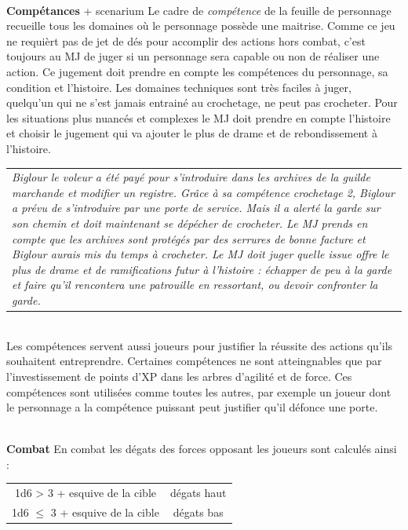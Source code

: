 \documentclass[11pt]{article} %
\newcommand{\myjump}[1][1]{\mbox{}\\[#1cm]}
\begin{document}
\myjump[0]
\textbf{Compétances} + scenarium\newline
Le cadre de \emph{compétence} de la feuille de personnage recueille tous les domaines où le personnage possède une maitrise. Comme ce jeu ne requièrt pas de jet de dés pour accomplir des actions hors combat, c'est toujours au MJ de juger si un personnage sera capable ou non de réaliser une action. Ce jugement doit prendre en compte les compétences du personnage, sa condition et l'histoire. Les domaines techniques sont très faciles à juger, quelqu'un qui ne s'est jamais entrainé au crochetage, ne peut pas crocheter. Pour les situations plus nuancés et complexes le MJ doit prendre en compte l'histoire et choisir le jugement qui va ajouter le plus de drame et de rebondissement à l'histoire.\newline\newline
\begin{tabularx}{\linewidth}{|X}
\emph{Biglour le voleur a été payé pour s'introduire dans les archives de la guilde marchande et modifier un registre. Grâce à sa compétence crochetage 2, Biglour a prévu de s'introduire par une porte de service. Mais il a alerté la garde sur son chemin et doit maintenant se dépécher de crocheter. Le MJ prends en compte que les archives sont protégés par des serrures de bonne facture et Biglour aurais mis du temps à crocheter.\newline
Le MJ doit juger quelle issue offre le plus de drame et de ramifications futur à l'histoire : échapper de peu à la garde et faire qu'il rencontera une patrouille en ressortant, ou devoir confronter la garde. }\\
\end{tabularx}
\myjump[0.4]
Les compétences servent aussi joueurs pour justifier la réussite des actions qu'ils souhaitent entreprendre. Certaines compétences ne sont atteingnables que par l'investissement de points d'XP dans les arbres d'agilité et de force. Ces compétences sont utilisées comme toutes les autres, par exemple un joueur dont le personnage a la compétence puissant peut justifier qu'il défonce une porte.

\myjump[0]
\textbf{Combat}\newline
En combat les dégats des forces opposant les joueurs sont calculés ainsi :

\noindent
\begin{tabular}{c|c}
    1d6 > 3 + esquive de la cible & dégats haut \\
    1d6 $\leq$ 3 + esquive de la cible & dégats bas \\
\end{tabular}
\end{document}
